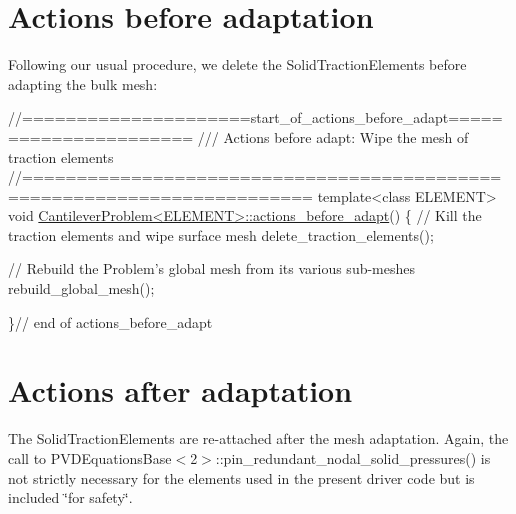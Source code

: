  

\hypertarget{index_before_adapt}{}\section{Actions before adaptation}\label{index_before_adapt}
Following our usual procedure, we delete the {\ttfamily Solid\+Traction\+Elements} before adapting the bulk mesh\+:

 
\begin{DoxyCodeInclude}
\textcolor{comment}{//=====================start\_of\_actions\_before\_adapt======================}
\textcolor{comment}{/// Actions before adapt: Wipe the mesh of traction elements}
\textcolor{comment}{}\textcolor{comment}{//========================================================================}
\textcolor{keyword}{template}<\textcolor{keyword}{class} ELEMENT>
\textcolor{keywordtype}{void} \hyperlink{classCantileverProblem_a50f8964219c507562945655e0ed5fc23}{CantileverProblem<ELEMENT>::actions\_before\_adapt}()
\{
 \textcolor{comment}{// Kill the traction elements and wipe surface mesh}
 delete\_traction\_elements();
 
 \textcolor{comment}{// Rebuild the Problem's global mesh from its various sub-meshes}
 rebuild\_global\_mesh();

\}\textcolor{comment}{// end of actions\_before\_adapt}

\end{DoxyCodeInclude}




 

\hypertarget{index_after_adapt}{}\section{Actions after adaptation}\label{index_after_adapt}
The {\ttfamily Solid\+Traction\+Elements} are re-\/attached after the mesh adaptation. Again, the call to {\ttfamily P\+V\+D\+Equations\+Base$<$2$>$\+::pin\+\_\+redundant\+\_\+nodal\+\_\+solid\+\_\+pressures()} is not strictly necessary for the elements used in the present driver code but is included \char`\"{}for safety\char`\"{}.

